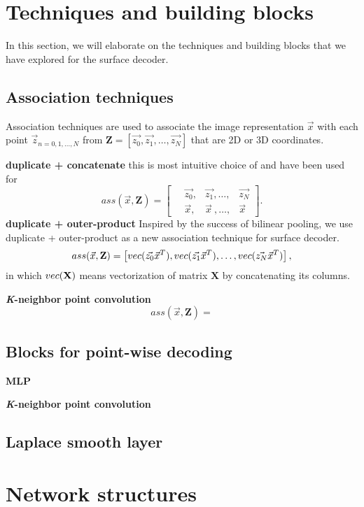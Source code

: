 \section{Techniques and building blocks}
In this section, we will elaborate on the techniques and building blocks that we have explored for the surface decoder. 
\subsection{Association techniques}
Association techniques are used to associate the image representation $\vec{x}$ with each point $\vec{z}_{n={0,1,\dots,N}}$ from $\mathbf{Z}=[\vec{z_0},\vec{z_1},\dots,\vec{z_N}]$ that are 2D or 3D coordinates.

\noindent\textbf{duplicate + concatenate}
this is most intuitive choice of and have been used for 
\begin{equation}
ass(\vec{x},\mathbf{Z})=\left[
\begin{aligned}
~&\vec{z_0},&\vec{z_1},\dots,&\vec{z_N}\\
~&\vec{x}  ,&\vec{x}~,\dots,&\vec{x}
\end{aligned}
\right].
\end{equation}
\noindent\textbf{duplicate + outer-product} 
Inspired by the success of bilinear pooling, we use duplicate + outer-product as a new association technique for surface decoder. 
\begin{equation}
ass(\vec{x},\mathbf{Z})=\left[
~\\vec(\vec{z_0}\vec{x}^T),\\vec(\vec{z_1}\vec{x}^T),\dots,\\vec(\vec{z_N}\vec{x}^T)\\
\right],
\end{equation}
in which $\\vec(\mathbf{X})$ means vectorization of matrix $\mathbf{X}$ by concatenating its columns.

\noindent\textbf{\emph{K}-neighbor point convolution}
\begin{equation}
ass(\vec{x},\mathbf{Z})=
\end{equation}

\subsection{Blocks for point-wise decoding}

\noindent\textbf{MLP}

\noindent\textbf{\emph{K}-neighbor point convolution}

\subsection{Laplace smooth layer}

\section{Network structures}
